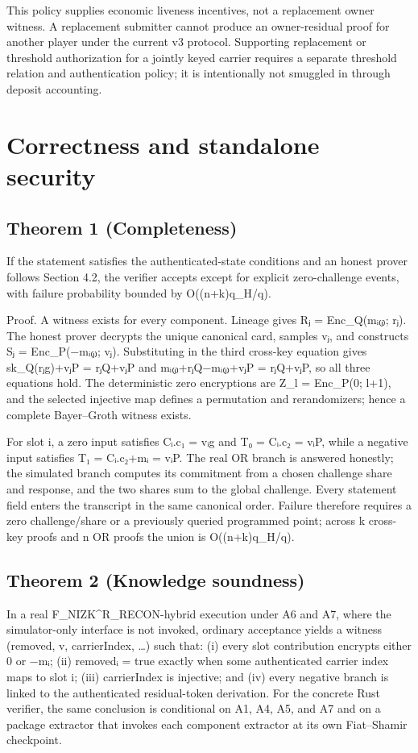 \documentclass[11pt]{article}
\begin{document}
This policy supplies economic liveness incentives, not a replacement owner witness. A replacement submitter cannot produce an owner-residual proof for another player under the current v3 protocol. Supporting replacement or threshold authorization for a jointly keyed carrier requires a separate threshold relation and authentication policy; it is intentionally not smuggled in through deposit accounting.

\section{Correctness and standalone security}

\subsection*{Theorem 1 (Completeness)}

If the statement satisfies the authenticated-state conditions and an honest prover follows Section 4.2, the verifier accepts except for explicit zero-challenge events, with failure probability bounded by O((n+k)q\_H/q).

Proof. A witness exists for every component. Lineage gives Rⱼ = Enc\_Q(mᵢ₍ⱼ₎; rⱼ). The honest prover decrypts the unique canonical card, samples vⱼ, and constructs Sⱼ = Enc\_P(−mᵢ₍ⱼ₎; vⱼ). Substituting in the third cross-key equation gives sk\_Q(rⱼg)+vⱼP = rⱼQ+vⱼP and mᵢ₍ⱼ₎+rⱼQ−mᵢ₍ⱼ₎+vⱼP = rⱼQ+vⱼP, so all three equations hold. The deterministic zero encryptions are Z\_l = Enc\_P(0; l+1), and the selected injective map defines a permutation and rerandomizers; hence a complete Bayer–Groth witness exists.

For slot i, a zero input satisfies Cᵢ.c₁ = vᵢg and T₀ = Cᵢ.c₂ = vᵢP, while a negative input satisfies T₁ = Cᵢ.c₂+mᵢ = vᵢP. The real OR branch is answered honestly; the simulated branch computes its commitment from a chosen challenge share and response, and the two shares sum to the global challenge. Every statement field enters the transcript in the same canonical order. Failure therefore requires a zero challenge/share or a previously queried programmed point; across k cross-key proofs and n OR proofs the union is O((n+k)q\_H/q).

\subsection*{Theorem 2 (Knowledge soundness)}

In a real F\_NIZK\^{}R\_RECON-hybrid execution under A6 and A7, where the simulator-only interface is not invoked, ordinary acceptance yields a witness (removed, v, carrierIndex, …) such that: (i) every slot contribution encrypts either 0 or −mᵢ; (ii) removedᵢ = true exactly when some authenticated carrier index maps to slot i; (iii) carrierIndex is injective; and (iv) every negative branch is linked to the authenticated residual-token derivation. For the concrete Rust verifier, the same conclusion is conditional on A1, A4, A5, and A7 and on a package extractor that invokes each component extractor at its own Fiat–Shamir checkpoint.
\end{document}
